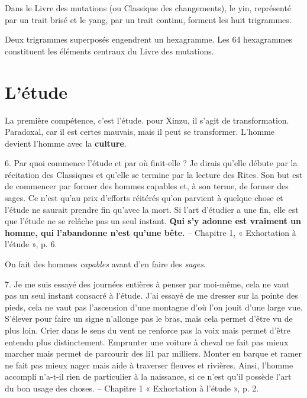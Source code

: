 Dans le Livre des mutations (ou Classique des changements), le yin, représenté par un trait brisé et le yang, par un trait continu, forment les huit trigrammes.


Deux trigrammes superposés engendrent un hexagramme. Les 64 hexagrammes constituent les éléments centraux du Livre des mutations. 

\section{L’étude}

La première compétence, c'est l'étude. pour Xinzu, il s'agit de transformation. Paradoxal, car il est certes mauvais, mais il peut se transformer. L'homme devient l'homme avec la \textbf{culture}.

\begin{singlequote}
    6.	Par quoi commence l’étude et par où finit-elle ? Je dirais qu’elle débute par la récitation des Classiques et qu’elle se termine par la lecture des Rites. Son but est de commencer par former des hommes capables et, à son terme, de former des sages. Ce n’est qu’au prix d’efforts réitérés qu’on parvient à quelque chose et l’étude ne saurait prendre fin qu’avec la mort. Si l’art d’étudier a une fin, elle est que l’étude ne se relâche pas un seul instant. \textbf{Qui s’y adonne est vraiment un homme, qui l’abandonne n’est qu’une bête.}
-- Chapitre 1, « Exhortation à l’étude », p. 6.
\end{singlequote}

On fait des hommes \textit{capables} avant d'en faire des \textit{sages}.


\begin{singlequote}
    7.	Je me suis essayé des journées entières à penser par moi-même, cela ne vaut pas un seul instant consacré à l’étude. J’ai essayé de me dresser sur la pointe des pieds, cela ne vaut pas l’ascension d’une montagne d’où l’on jouit d’une large vue. S’élever pour faire un signe n’allonge pas le bras, mais cela permet d’être vu de plus loin. Crier dans le sens du vent ne renforce pas la voix mais permet d’être entendu plus distinctement. Emprunter une voiture à cheval ne fait pas mieux marcher mais permet de parcourir des li1 par milliers. Monter en barque et ramer ne fait pas
 mieux nager mais aide à traverser fleuves et rivières. Ainsi, l’homme accompli n’a-t-il rien de particulier à la naissance, si ce n’est qu’il possède l’art du bon usage des choses.
-- Chapitre 1 « Exhortation à l’étude », p. 2.
\end{singlequote}



